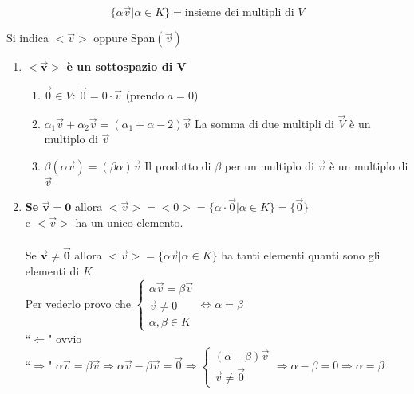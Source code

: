 $$\{\alpha\vec{v}|\alpha\in K\}=\textrm{insieme dei multipli di }V$$
\begin{center}
    Si indica $<\vec{v}>$ oppure Span$(\vec{v})$
\end{center}
\begin{enumerate}
    \item $\pmb{<\vec{v}>}$ \textbf{è un sottospazio di V}
        \begin{enumerate}
            \item $\vec{0}\in V$: $\vec{0}=0\cdot \vec{v}$ (prendo $a=0$)
            \item $\alpha_1\vec{v}+\alpha_2\vec{v}=(\alpha_1+\alpha-2)\vec{v}$ 
                La somma di due multipli di $\vec{V}$ è un multiplo di $\vec{v}$
            \item $\beta(\alpha\vec{v})=(\beta\alpha)\vec{v}$
                Il prodotto di $\beta$ per un multiplo di $\vec{v}$ è un multiplo di $\vec{v}$
        \end{enumerate}
    \item \textbf{Se }$\pmb{\vec{v}=0}$ allora $<\vec{v}>=<0>=\{\alpha\cdot\vec{0}| 
        \alpha \in K \} = \{\vec{0}\}$\\
        e $<\vec{v}>$ ha un unico elemento.\\\\
        Se $\pmb{\vec{v}\neq \vec{0}}$ allora $<\vec{v}>= 
        \{\alpha\vec{v}|\alpha\in K\}$
        ha tanti elementi quanti sono gli elementi di $K$\\
        Per vederlo provo che 
        $ 
        \begin{cases}
            \alpha\vec{v}=\beta\vec{v}\\
            \vec{v}\neq 0\\
            \alpha,\beta\in K
        \end{cases}
        \Longleftrightarrow
        \alpha = \beta
        $\\
        ``$\Longleftarrow$" ovvio\\
        ``$\Longrightarrow$" $\alpha\vec{v}=\beta\vec{v}\Rightarrow\alpha\vec{v}
        -\beta\vec{v}=\vec{0}\Rightarrow
        \begin{cases}
            (\alpha-\beta)\vec{v}\\
            \vec{v}\neq \vec{0}
        \end{cases}
        \Longrightarrow \alpha - \beta =0 \Longrightarrow\alpha=\beta$
\end{enumerate}

